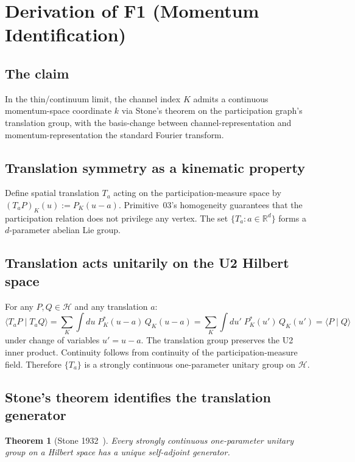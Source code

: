 \documentclass[11pt,a4paper]{article}
\newtheorem{theorem}{Theorem}[section]
\begin{document}
\section{Derivation of F1 (Momentum Identification)}\label{sec:F1}

\subsection{The claim}

In the thin/continuum limit, the channel index $K$ admits a continuous momentum-space coordinate $k$ via Stone's theorem on the participation graph's translation group, with the basis-change between channel-representation and momentum-representation the standard Fourier transform.

\subsection{Translation symmetry as a kinematic property}

Define spatial translation $T_a$ acting on the participation-measure space by $(T_a P)_K(u) := P_K(u - a)$. Primitive~03's homogeneity guarantees that the participation relation does not privilege any vertex. The set $\{T_a : a \in \mathbb{R}^d\}$ forms a $d$-parameter abelian Lie group.

\subsection{Translation acts unitarily on the U2 Hilbert space}

For any $P, Q \in \mathcal{H}$ and any translation $a$:
\[
\langle T_a P \mid T_a Q \rangle = \sum_K \int du \; P_K^*(u - a) \, Q_K(u - a) = \sum_K \int du' \; P_K^*(u') \, Q_K(u') = \langle P \mid Q \rangle
\]
under change of variables $u' = u - a$. The translation group preserves the U2 inner product. Continuity follows from continuity of the participation-measure field. Therefore $\{T_a\}$ is a strongly continuous one-parameter unitary group on $\mathcal{H}$.

\subsection{Stone's theorem identifies the translation generator}

\begin{theorem}[Stone 1932~\cite{stone}]
Every strongly continuous one-parameter unitary group on a Hilbert space has a unique self-adjoint generator.
\end{theorem}
\end{document}
